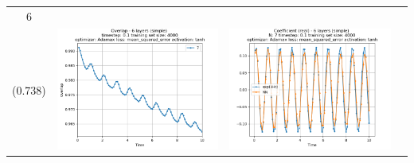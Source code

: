 \documentclass{article}
\begin{document}
\begin{tabular}{|c|c|c|c|}
     6 \\ (0.738) &
     \includegraphics[scale=0.37]{./6_layers_simple_train_samples=4000_timestep=0.1_t_total=10.0_optimizer=Adamax_loss=mean_squared_error_activation=tanh/Overlap.png} &
     \includegraphics[scale=0.37]{./6_layers_simple_train_samples=4000_timestep=0.1_t_total=10.0_optimizer=Adamax_loss=mean_squared_error_activation=tanh/Coeff_N=7_(real).png} &

\end{tabular}
\end{document}
